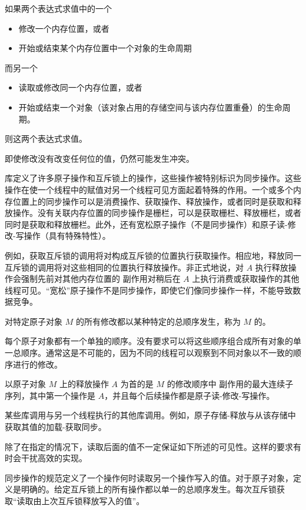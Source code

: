 \pnum
如果两个表达式求值中的一个
\begin{itemize}
\item
修改一个内存位置，或者
\item
开始或结束某个内存位置中一个对象的生命周期
\end{itemize}
而另一个
\begin{itemize}
\item
读取或修改同一个内存位置，或者
\item
开始或结束一个对象（该对象占用的存储空间与该内存位置重叠）的生命周期。
\end{itemize}
则这两个表达式求值。

\begin{note}
即使修改没有改变任何位的值，仍然可能发生冲突。
\end{note}

\pnum
库定义了许多原子操作和互斥锁上的操作，这些操作被特别标识为同步操作。这些操作在使一个线程中的赋值对另一个线程可见方面起着特殊的作用。一个或多个内存位置上的同步操作可以是消费操作、获取操作、释放操作，或者同时是获取和释放操作。没有关联内存位置的同步操作是栅栏，可以是获取栅栏、释放栅栏，或者同时是获取和释放栅栏。此外，还有宽松原子操作（不是同步操作）和原子读-修改-写操作（具有特殊特性）。
\begin{note}
例如，获取互斥锁的调用将对构成互斥锁的位置执行获取操作。相应地，释放同一互斥锁的调用将对这些相同的位置执行释放操作。非正式地说，对 $A$ 执行释放操作会强制先前对其他内存位置的
%
副作用对稍后在 $A$ 上执行消费或获取操作的其他线程可见。“宽松”原子操作不是同步操作，即使它们像同步操作一样，不能导致数据竞争。
\end{note}

\pnum
对特定原子对象 $M$ 的所有修改都以某种特定的总顺序发生，称为 $M$ 的。
\begin{note}
每个原子对象都有一个单独的顺序。没有要求可以将这些顺序组合成所有对象的单一总顺序。通常这是不可能的，因为不同的线程可以观察到不同对象以不一致的顺序进行的修改。
\end{note}

\pnum
以原子对象 $M$ 上的释放操作 $A$ 为首的是 $M$ 的修改顺序中
%
副作用的最大连续子序列，其中第一个操作是 $A$，并且每个后续操作都是原子读-修改-写操作。

\pnum
某些库调用与另一个线程执行的其他库调用。例如，原子存储-释放与从该存储中获取其值的加载-获取同步。
\begin{note}
除了在指定的情况下，读取后面的值不一定保证如下所述的可见性。这样的要求有时会干扰高效的实现。
\end{note}
\begin{note}
同步操作的规范定义了一个操作何时读取另一个操作写入的值。对于原子对象，定义是明确的。给定互斥锁上的所有操作都以单一的总顺序发生。每次互斥锁获取“读取由上次互斥锁释放写入的值”。
\end{note}

